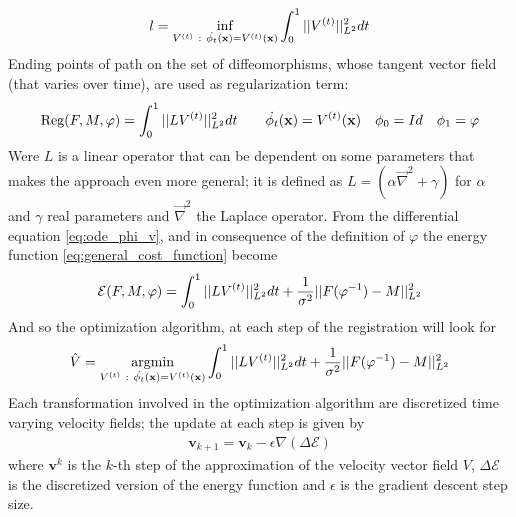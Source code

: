 \begin{align*}
l = \inf_{V^{(t)} ~ : ~ \dot{\phi_{t}} (\mathbf{x}) = V^{(t)}(\mathbf{x} )}  \int_{0}^{1} \vert\lvert V^{(t)} \rvert\vert_{L^2}^{2}dt
\end{align*}
Ending points of path on the set of diffeomorphisms, whose tangent vector field (that varies over time), are used as regularization term:
\begin{align*}
\text{Reg}(F,M,\varphi) =  \int_0^1  \vert\lvert L V^{(t)}  \rvert\vert_{L^{2}}^{2}  dt
\qquad 
\dot{\phi_{t}} (\mathbf{x}) = V^{(t)}(\mathbf{x} ) 
\quad 
\phi_{0} = Id
\quad 
\phi_{1} = \varphi
\end{align*}
Were $L$ is a linear operator that can be dependent on some parameters that makes the approach even more general; it is defined as $L = (\alpha\vec \nabla^2 + \gamma)$ for $\alpha$ and $\gamma$ real parameters and $\vec \nabla^2$ the Laplace operator.
From the differential equation \ref{eq:ode_phi_v}, and in consequence of the definition of $\varphi$ the energy function \ref{eq:general_cost_function} become
\begin{align*}
\mathcal{E}(F, M, \varphi) 
= 
\int_0^1 \vert\lvert L V^{(t)}  \rvert\vert_{L^{2}}^{2} dt + \frac{1}{\sigma^2}\vert\lvert F(\varphi^{-1})  - M   \rvert\vert_{L^{2}}^{2}
\end{align*}
And so the optimization algorithm, at each step of the registration will look for
\begin{align*}
\hat{V} 
= 
\argmin_{V^{(t)} ~ : ~ \dot{\phi_{t}} (\mathbf{x}) = V^{(t)}(\mathbf{x} ) } 
\int_0^1 \euclideanMetric{L V^{(t)} }_{L^{2}}^{2} dt + \frac{1}{\sigma^2}\euclideanMetric{F(\varphi^{-1})  - M  }_{L^{2}}^{2}
\end{align*}
Each transformation involved in the optimization algorithm are discretized time varying velocity fields; the update at each step is given by
\begin{align*}
\mathbf{v}_{k+1} = \mathbf{v}_{k} - \epsilon \nabla (\Delta\mathcal{E})
\end{align*}
where $\mathbf{v}^{k}$ is the $k$-th step of the approximation of the velocity vector field $V$, $\Delta\mathcal{E}$ is the discretized version of the energy function and $\epsilon$ is the gradient descent step size.\\

